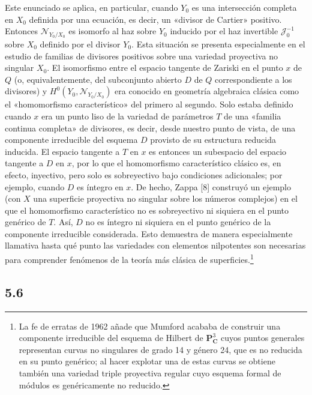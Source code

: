  Este enunciado se aplica, en particular, cuando
$Y_0$ es una intersección completa en $X_0$ definida por una ecuación, es
decir, un «divisor de Cartier» positivo. Entonces $\mathcal N_{Y_0/X_0}$ es
isomorfo al haz sobre $Y_0$ inducido por el haz invertible
$\mathcal J_0^{-1}$ sobre $X_0$ definido por el divisor $Y_0$. Esta situación
se presenta especialmente en el estudio de familias de divisores positivos
sobre una variedad proyectiva no singular $X_0$. El isomorfismo entre el
espacio tangente de Zariski en el punto $x$ de $Q$ (o, equivalentemente, del
subconjunto abierto $D$ de $Q$ correspondiente a los divisores) y
$H^0(Y_0,\mathcal N_{Y_0/X_0})$ era conocido en geometría algebraica clásica
como el «homomorfismo característico» del primero al segundo. Solo estaba
definido cuando $x$ era un punto liso de la variedad de parámetros $T$ de una
«familia continua completa» de divisores, es decir, desde nuestro punto de
vista, de una componente irreducible del esquema $D$ provisto de su estructura
reducida inducida. El
espacio tangente a $T$ en $x$ es entonces un subespacio del espacio tangente a
$D$ en $x$, por lo que el homomorfismo característico clásico es, en efecto,
inyectivo, pero solo es sobreyectivo bajo condiciones adicionales; por ejemplo,
cuando $D$ es íntegro en $x$. De hecho, Zappa [8] construyó un ejemplo
(con $X$ una superficie proyectiva no singular sobre los números complejos) en
el que el homomorfismo característico no es sobreyectivo ni siquiera en el
punto genérico de $T$. Así, $D$ no es íntegro ni siquiera en el punto genérico
de la componente irreducible considerada. Esto demuestra de manera
especialmente llamativa hasta qué punto las variedades con elementos
nilpotentes son necesarias para comprender fenómenos de la teoría más clásica
de superficies.\footnote{La fe de erratas de 1962 añade que Mumford acababa de
construir una componente irreducible del esquema de Hilbert de
$\mathbf P^3_{\mathbf C}$ cuyos puntos generales representan curvas no
singulares de grado 14 y género 24, que es no reducida en su punto genérico;
al hacer explotar una de estas curvas se obtiene también una variedad triple
proyectiva regular cuyo esquema formal de módulos es genéricamente no
reducido.}

\subsection*{5.6}

